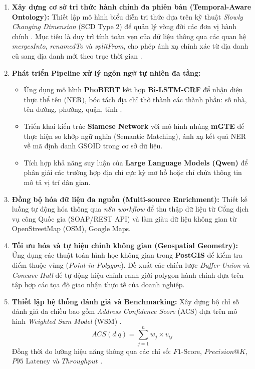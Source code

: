 \begin{enumerate}
\item \textbf{Xây dựng cơ sở tri thức hành chính đa phiên bản (Temporal-Aware Ontology):} Thiết lập mô hình biểu diễn tri thức dựa trên kỹ thuật \textit{Slowly Changing Dimension} (SCD Type 2) để quản lý vòng đời các đơn vị hành chính \cite{kimball2013}. Mục tiêu là duy trì tính toàn vẹn của dữ liệu thông qua các quan hệ \textit{mergesInto}, \textit{renamedTo} và \textit{splitFrom}, cho phép ánh xạ chính xác từ địa danh cũ sang địa danh mới theo trục thời gian \cite{bilmener2022ontology}.

\item \textbf{Phát triển Pipeline xử lý ngôn ngữ tự nhiên đa tầng:} 
\begin{itemize}
    \item Ứng dụng mô hình \textbf{PhoBERT} kết hợp \textbf{Bi-LSTM-CRF} để nhận diện thực thể tên (NER), bóc tách địa chỉ thô thành các thành phần: số nhà, tên đường, phường, quận, tỉnh \cite{nguyen2020phobert}.
    \item Triển khai kiến trúc \textbf{Siamese Network} với mô hình nhúng \textbf{mGTE} để thực hiện so khớp ngữ nghĩa (Semantic Matching), ánh xạ kết quả NER về mã định danh GSOID trong cơ sở dữ liệu.
    \item Tích hợp khả năng suy luận của \textbf{Large Language Models (Qwen)} để phân giải các trường hợp địa chỉ cực kỳ mơ hồ hoặc chỉ chứa thông tin mô tả vị trí dân gian.
\end{itemize}

\item \textbf{Đồng bộ hóa dữ liệu đa nguồn (Multi-source Enrichment):} Thiết kế luồng tự động hóa thông qua \textit{n8n workflow} để thu thập dữ liệu từ Cổng dịch vụ công Quốc gia (SOAP/REST API) và làm giàu dữ liệu không gian từ OpenStreetMap (OSM), Google Maps.

\item \textbf{Tối ưu hóa và tự hiệu chỉnh không gian (Geospatial Geometry):} Ứng dụng các thuật toán hình học không gian trong \textbf{PostGIS} để kiểm tra điểm thuộc vùng (\textit{Point-in-Polygon}). Đề xuất các chiến lược \textit{Buffer-Union} và \textit{Concave Hull} để tự động hiệu chỉnh ranh giới polygon hành chính dựa trên tập hợp các tọa độ giao nhận thực tế của doanh nghiệp.

\item \textbf{Thiết lập hệ thống đánh giá và Benchmarking:} Xây dựng bộ chỉ số đánh giá đa chiều bao gồm \textit{Address Confidence Score} (ACS) dựa trên mô hình \textit{Weighted Sum Model} (WSM) \cite{zavadskas2019multiple}. 
\begin{equation}
    ACS(d|q) = \sum_{j=1}^{n} w_j \times v_{ij}
\end{equation}
Đồng thời đo lường hiệu năng thông qua các chỉ số: $F1\text{-Score}$, $Precision@K$, $P95\text{ Latency}$ và $Throughput$ \cite{manning2008IR}.

\end{enumerate}

